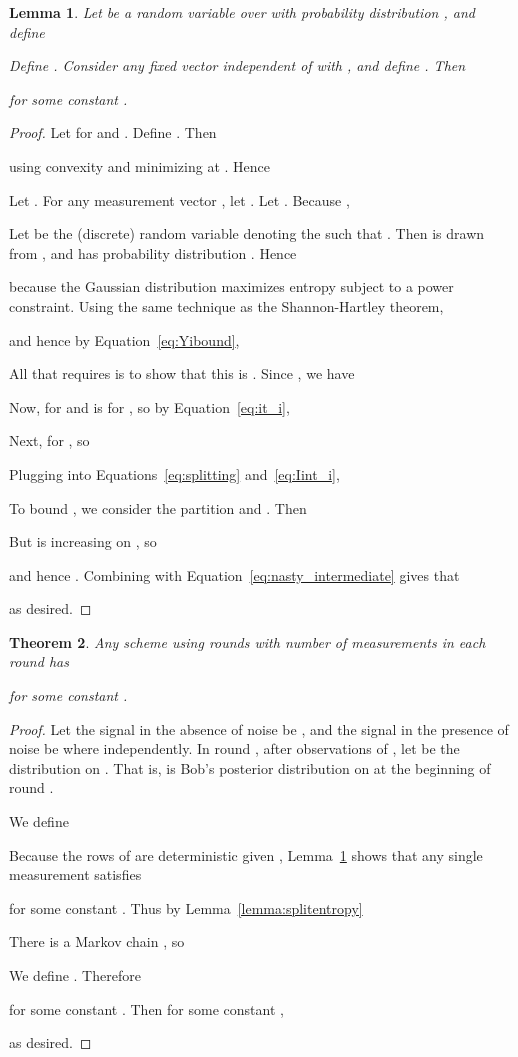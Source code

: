 \documentclass[twoside,leqno,twocolumn]{article}
\newtheorem{theorem}{Theorem}[section]
\newtheorem{lemma}[theorem]{Lemma}
\begin{document}
\begin{lemma}\label{lemma:oneround}
  Let  be a random variable over  with probability
  distribution , and define
  
  Define .  Consider any fixed
  vector  independent of  with , and
  define .  Then
  
  for some constant .
\end{lemma}
\begin{proof}
  Let  for  and
  .  Define .  Then
  
  using convexity and minimizing  at .  Hence
  

  Let .  For any measurement vector , let .  Let .
  Because ,
  
  Let  be the (discrete) random variable denoting the  such that
  .  Then  is drawn from , and  has
  probability distribution .  Hence
  
  because the Gaussian distribution maximizes entropy subject to a
  power constraint.  Using the same technique as the Shannon-Hartley
  theorem,
  
  and hence by Equation~\eqref{eq:Yibound},
  

  All that requires is to show that this is .  Since , we have
  
  Now,  for  and is  for , so by Equation~\eqref{eq:it_i},
  
  Next,  for , so
  
  Plugging into Equations~\eqref{eq:splitting} and~\eqref{eq:Iint_i},
  
  To bound , we consider the partition  and .  Then
  
  But  is increasing on , so
  
  and hence .  Combining with
  Equation~\eqref{eq:nasty_intermediate} gives that
  
  as desired.
\end{proof}

\begin{theorem}
  Any scheme using  rounds with number of measurements  in each round has
  
  for some constant .
\end{theorem}
\begin{proof}
  Let the signal in the absence of noise be , and the signal in the presence of noise be  where  independently.  In round , after observations
   of , let  be the
  distribution on .  That is, 
  is Bob's posterior distribution on  at the beginning of round
  .

  We define
  
  Because the rows of  are deterministic given , Lemma~\ref{lemma:oneround} shows that any single
  measurement  satisfies
  
  for some constant .  Thus by Lemma~\ref{lemma:splitentropy}
  
  There is a Markov chain , so
  
  We define .  Therefore
  
  for some constant .  Then for some constant ,
  
  as desired.
\end{proof}
\end{document}
